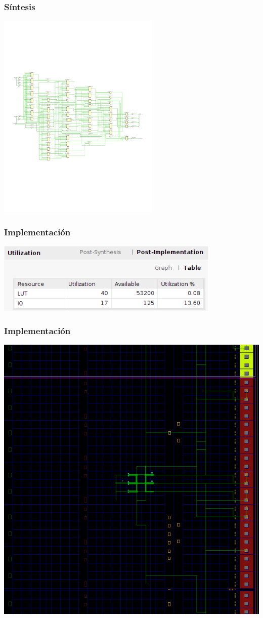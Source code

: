 \documentclass[spanish]{beamer}
\begin{document}
\begin{frame}
    \frametitle{Síntesis}
    \centering
    \includegraphics[height=10cm]{img/syn_schematic.pdf}
\end{frame}

\begin{frame}
    \frametitle{Implementación}
    \centering
    \includegraphics[width=0.8\textwidth]{img/imp_table.png}
\end{frame}

\begin{frame}
    \frametitle{Implementación}
    \centering
    \includegraphics[width=\textwidth]{img/imp_device.png}
\end{frame}
\end{document}
